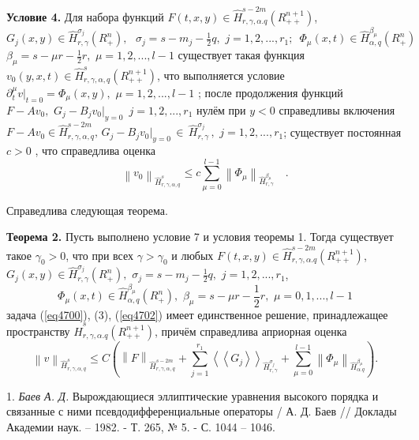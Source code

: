 \textbf{Условие 4. }Для набора функций $F(t,x,y) \in \hat {H}_{r,\gamma
,\alpha .q}^{s - 2m} (R_{ + + }^{n + 1} )$, $G_j (x,y) \in \hat
{H}_{r,\gamma }^{\sigma _j } (R_ + ^n ),\,\,\,\,\sigma _j = s - m_j -
\frac{1}{2}q,\,\,j = 1,2,...,r_1 ;\,\,\,\Phi _\mu (x,t) \in \hat {H}_{\alpha
,q}^{\beta _\mu } (R_ + ^n )$
$\beta _\mu = s - \mu r - \frac{1}{2}r,\,\,\mu = 1,2,...,l -1$
существует такая функция
$v_0 (y,x,t) \in \hat {H}_{r,\gamma ,\alpha ,q}^s (R_{ + + }^{n + 1}
)$,
что
выполняется условие $\partial _t^\mu \left. v \right|_{t = 0} = \Phi _\mu
(x,y),\,\,\mu = 1,2,...,l - 1$ ;
после продолжения функций $F - Av_0 ,\,\,G_j - B_j v_0 \vert _{y = 0}
\,\,\,j = 1,2,...,r_1 $ нулём при $y < 0$ справедливы включения $F - Av_0 \in
\hat {H}_{r,\gamma ,\alpha ,q}^{s - 2m} ,\,G_j - B_j v_0 \vert _{y = 0} \,
\in \,\hat {H}_{r,\gamma }^{\sigma _j } \,,\,\,j = 1,2,...,r_1 $;
существует постоянная $c > 0$ , что справедлива оценка
\[
\left\| {v_0 } \right\|_{\hat {H}_{r,\gamma ,\alpha ,q}^s } \leqslant
c\sum\limits_{\mu = 0}^{l - 1} {\left\| {\Phi _\mu } \right\|} _{\hat
{H}_{r,\gamma }^{\beta _\mu } } \quad .
\]







Справедлива следующая теорема.

\textbf{Теорема 2. }Пусть выполнено условие 7 и условия теоремы 1. Тогда
существует такое $\gamma _0 > 0$, что при всех $\gamma > \gamma _0 $ и любых
$F(t,x,y) \in \hat {H}_{r,\gamma ,\alpha .q}^{s - 2m} (R_{ + + }^{n + 1} )$,
$G_j (x,y) \in \hat {H}_{r,\gamma }^{\sigma _j } (R_ + ^n ),\,\,\sigma _j =
s - m_j - \frac{1}{2}q,\,\,j = 1,2,...,r_1 $,
\[
\Phi _\mu (x,t) \in \hat {H}_{\alpha ,q}^{\beta _\mu } (R_ + ^n ),\,\,\beta
_\mu = s - \mu r - \frac{1}{2}r,\,\,\mu = 0,1,...,l - 1
\]
задача (\ref{eq4700}), (3), (\ref{eq4702}) имеет единственное решение, принадлежащее пространству
$\hat {H}_{r,\gamma ,\alpha .q}^s (R_{ + + }^{n + 1} )$, причём справедлива
априорная оценка
\[
\left\| v \right\|_{\hat {H}_{r,\gamma ,\alpha ,q}^s } \leqslant C(\left\| F
\right\|_{\hat {H}_{r,\gamma ,\alpha ,q}^{s - 2m} } + \sum\limits_{j =
1}^{r_1 } {\left\langle {\left\langle {G_j } \right\rangle } \right\rangle }
_{\hat {H}_{r,\gamma }^{\sigma _j } } + \sum\limits_{\mu = 0}^{l - 1}
{\left\| {\Phi _\mu } \right\|} _{\hat {H}_{\alpha .q}^{\beta _\mu } } ) .
\]



\litlist

1. {\it Баев А. Д.} Вырождающиеся эллиптические уравнения высокого порядка и
связанные с ними псевдодифференциальные операторы / А. Д. Баев // Доклады
Академии наук. -- 1982. - Т. 265, № 5. - С. 1044 -- 1046.

